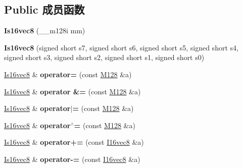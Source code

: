 \subsection*{Public 成员函数}
\begin{DoxyCompactItemize}
\item 
\mbox{\label{class_is16vec8_afffa519a8dcc6302d09773c7ce996e48}} 
{\bfseries Is16vec8} (\+\_\+\+\_\+m128i mm)
\item 
\mbox{\label{class_is16vec8_a11b25251b0f2a4af90307f4445e2f923}} 
{\bfseries Is16vec8} (signed short s7, signed short s6, signed short s5, signed short s4, signed short s3, signed short s2, signed short s1, signed short s0)
\item 
\mbox{\label{class_is16vec8_a3f8c1b234c093c6aaa8be38048938d3d}} 
\hyperlink{class_is16vec8}{Is16vec8} \& {\bfseries operator=} (const \hyperlink{class_m128}{M128} \&a)
\item 
\mbox{\label{class_is16vec8_afbafec335326ce82fb8ae58c2cfeab68}} 
\hyperlink{class_is16vec8}{Is16vec8} \& {\bfseries operator \&=} (const \hyperlink{class_m128}{M128} \&a)
\item 
\mbox{\label{class_is16vec8_a353186e0b704a5304d0706fbf432cfa5}} 
\hyperlink{class_is16vec8}{Is16vec8} \& {\bfseries operator$\vert$=} (const \hyperlink{class_m128}{M128} \&a)
\item 
\mbox{\label{class_is16vec8_adb0ab9c9132e429869a78c38621a892e}} 
\hyperlink{class_is16vec8}{Is16vec8} \& {\bfseries operator$^\wedge$=} (const \hyperlink{class_m128}{M128} \&a)
\item 
\mbox{\label{class_is16vec8_a7d49685ddbbfd3a0af0e2c4c5e0095f1}} 
\hyperlink{class_is16vec8}{Is16vec8} \& {\bfseries operator+=} (const \hyperlink{class_i16vec8}{I16vec8} \&a)
\item 
\mbox{\label{class_is16vec8_af321eb968eec9584c281bd6e9efa63ed}} 
\hyperlink{class_is16vec8}{Is16vec8} \& {\bfseries operator-\/=} (const \hyperlink{class_i16vec8}{I16vec8} \&a)
\item 
\mbox{\label{class_is16vec8_a808e82e1e1aab1c64bab3146bd563d76}} 

\end{DoxyCompactItemize}
